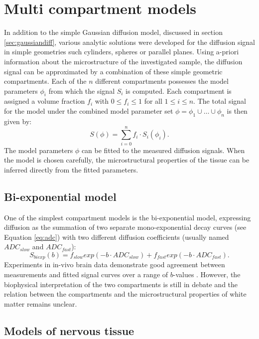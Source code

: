 \section{Multi compartment models}
In addition to the simple Gaussian diffusion model, discussed in section \ref{sec:gaussiandiff}, various analytic solutions were developed for the diffusion signal in simple geometries such cylinders, spheres or parallel planes\cite{TODO}. Using a-priori information about the microstructure of the investigated sample, the diffusion signal can be approximated by a combination of these simple geometric compartments. Each of the $n$ different compartments possesses the model parameters $\phi_{i}$ from which the signal $S_i$ is computed. Each compartment is assigned a volume fraction $f_i$ with $0 \le f_i \le 1$ for all $1 \le i \le n$. The total signal for the model under the combined model parameter set $\phi=\phi_{1}\cup\dots\cup\phi_{n}$ is then given by:
\begin{equation}
	S(\phi)=\sum_{i=0}^{n}f_i\cdot S_i(\phi_i).
\end{equation}
The model parameters $\phi$ can be fitted to the measured diffusion signals. When the model is chosen carefully, the microstructural properties of the tissue  can be inferred directly from the fitted parameters.


\subsection*{Bi-exponential model}
One of the simplest compartment models is the bi-exponential model, expressing diffusion as the summation of two separate mono-exponential decay curves (see Equation \ref{eq:adc}) with two different diffusion coefficients (usually named $ADC_{slow}$ and $ADC_{fast}$):
\begin{equation}
	S_{biexp}(b) = f_{slow} exp(-b\cdot ADC_{slow}) + f_{fast} exp(-b\cdot ADC_{fast}).
\end{equation}
Experiments in in-vivo brain data demonstrate good agreement between measurements and fitted signal curves over a range of $b$-values \cite{clark02}. However, the biophysical interpretation of the two compartments is still in debate and the relation between the compartments and the microstructural properties of white matter remains unclear. 
\subsection*{Models of nervous tissue}
